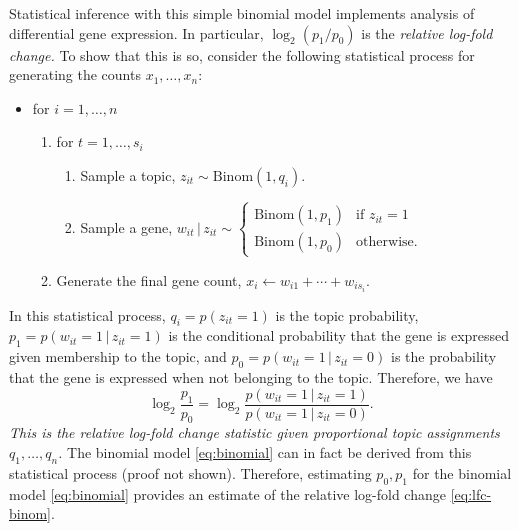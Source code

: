 \documentclass[final]{siamart171218}
\begin{document}
Statistical inference with this simple binomial model implements
analysis of differential gene expression. In particular,
$\log_2(p_1/p_0)$ is the {\em relative log-fold change.} To show that
this is so, consider the following statistical process for generating
the counts $x_1, \ldots, x_n$:
\vspace{1em}
\begin{itemize}

\item for $i = 1, \ldots, n$
\begin{enumerate}

  \item for $t = 1, \ldots, s_i$
  \begin{enumerate}

  \item Sample a topic, $z_{it} \sim \mathrm{Binom}(1,q_i)$.

  \item Sample a gene, $w_{it} \,|\, z_{it} \sim \left\{\begin{array}{ll}
  \mathrm{Binom}(1,p_1) & \mbox{if $z_{it} = 1$} \\
  \mathrm{Binom}(1,p_0) & \mbox{otherwise.}
  \end{array}\right.$

  \end{enumerate}

  \item Generate the final gene count, 
  $x_i \leftarrow w_{i1} + \cdots + w_{is_i}$.

\end{enumerate}
\end{itemize}
\vspace{1em} In this statistical process, $q_i = p(z_{it} = 1)$ is the
topic probability, $p_1 = p(w_{it} = 1 \,|\, z_{it} = 1)$ is the
conditional probability that the gene is expressed given membership to
the topic, and $p_0 = p(w_{it} = 1 \,|\, z_{it} = 0)$ is the
probability that the gene is expressed when not belonging to the
topic. Therefore, we have
\begin{equation}
\log_2 \frac{p_1}{p_0} = 
\log_2 \frac{p(w_{it} = 1 \,|\, z_{it} = 1)}
            {p(w_{it} = 1 \,|\, z_{it} = 0)}.
\label{eq:lfc-binom}
\end{equation}
{\em This is the relative log-fold change statistic given proportional
  topic assignments $q_1, \ldots, q_n$.} The binomial model
\eqref{eq:binomial} can in fact be derived from this statistical
process (proof not shown). Therefore, estimating $p_0, p_1$ for the
binomial model \eqref{eq:binomial} provides an estimate of the
relative log-fold change \eqref{eq:lfc-binom}.
\end{document}
